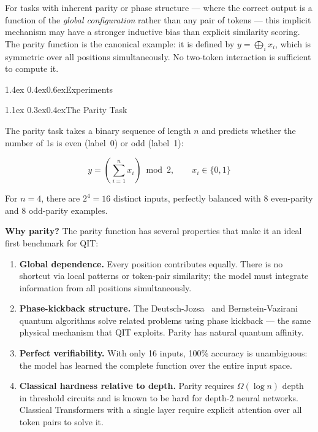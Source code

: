 \documentclass[11pt,a4paper]{article}
\makeatletter
\renewcommand\section{\@startsection{section}{1}{\z@}%
  {1.4ex \@plus 0.4ex}{0.6ex}{\normalfont\large\bfseries}}
\renewcommand\subsection{\@startsection{subsection}{2}{\z@}%
  {1.1ex \@plus 0.3ex}{0.4ex}{\normalfont\normalsize\bfseries}}
\makeatother
\begin{document}
For tasks with inherent parity or phase structure --- where the correct output is a
function of the \emph{global configuration} rather than any pair of tokens --- this
implicit mechanism may have a stronger inductive bias than explicit similarity scoring.
The parity function is the canonical example: it is defined by
$y = \bigoplus_i x_i$, which is symmetric over all positions simultaneously. No
two-token interaction is sufficient to compute it.

\section{Experiments}
\label{sec:experiments}

\subsection{The Parity Task}

The parity task takes a binary sequence of length $n$ and predicts whether the number
of 1s is even (label~0) or odd (label~1):

\begin{equation}
  y = \left(\sum_{i=1}^{n} x_i\right) \bmod 2, \qquad x_i \in \{0,1\}
  \label{eq:parity}
\end{equation}

For $n = 4$, there are $2^4 = 16$ distinct inputs, perfectly balanced with 8
even-parity and 8 odd-parity examples.

\textbf{Why parity?} The parity function has several properties that make it an ideal
first benchmark for QIT:

\begin{enumerate}
  \item \textbf{Global dependence.} Every position contributes equally. There is no
        shortcut via local patterns or token-pair similarity; the model must integrate
        information from all positions simultaneously.

  \item \textbf{Phase-kickback structure.} The Deutsch-Jozsa~\cite{deutsch1992rapid} and
        Bernstein-Vazirani~\cite{bernstein1997quantum} quantum algorithms solve related
        problems using phase kickback --- the same physical mechanism that QIT exploits.
        Parity has natural quantum affinity.

  \item \textbf{Perfect verifiability.} With only 16 inputs, 100\% accuracy is
        unambiguous: the model has learned the complete function over the entire input space.

  \item \textbf{Classical hardness relative to depth.} Parity requires $\Omega(\log n)$
        depth in threshold circuits and is known to be hard for depth-2 neural networks.
        Classical Transformers with a single layer require explicit attention over all
        token pairs to solve it.
\end{enumerate}
\end{document}
